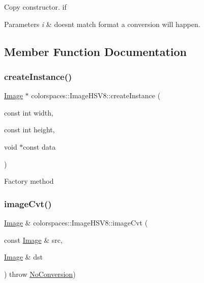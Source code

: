 Copy constructor. if 
\begin{DoxyParams}{Parameters}
{\em i} & doesn\textquotesingle{}t match format a conversion will happen. \\
\hline
\end{DoxyParams}


\subsection{Member Function Documentation}
\mbox{\label{classcolorspaces_1_1_image_h_s_v8_a2902afeba297cbf8c9278c567c943966}} 
\subsubsection{\texorpdfstring{create\+Instance()}{createInstance()}}
{\footnotesize\ttfamily \hyperlink{classcolorspaces_1_1_image}{Image} $\ast$ colorspaces\+::\+Image\+H\+S\+V8\+::create\+Instance (\begin{DoxyParamCaption}\item[{const int}]{width,  }\item[{const int}]{height,  }\item[{void $\ast$const}]{data }\end{DoxyParamCaption})\hspace{0.3cm}{\ttfamily [static]}}

Factory method \mbox{\label{classcolorspaces_1_1_image_h_s_v8_a95bd0f819144ad097ab64ec82051f796}} 
\subsubsection{\texorpdfstring{image\+Cvt()}{imageCvt()}}
{\footnotesize\ttfamily \hyperlink{classcolorspaces_1_1_image}{Image} \& colorspaces\+::\+Image\+H\+S\+V8\+::image\+Cvt (\begin{DoxyParamCaption}\item[{const \hyperlink{classcolorspaces_1_1_image}{Image} \&}]{src,  }\item[{\hyperlink{classcolorspaces_1_1_image}{Image} \&}]{dst }\end{DoxyParamCaption}) throw  \hyperlink{classcolorspaces_1_1_image_1_1_no_conversion}{No\+Conversion}) \hspace{0.3cm}{\ttfamily [static]}}

